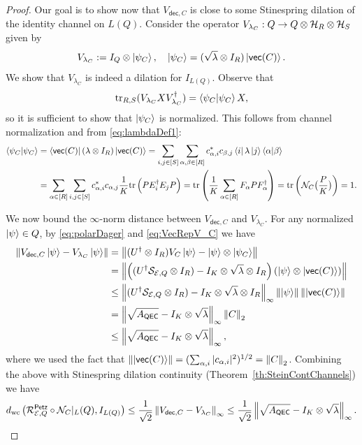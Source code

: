 \documentclass[10pt]{article}
\newcommand{\tr}{\mathrm{tr}}
\newcommand{\p}[1]{\left(#1\right)}
\newcommand{\norm}[1]{\left\|#1\right\|}
\newcommand{\s}[1]{\mathsf{#1}}
\begin{document}
\begin{proof}
     Our goal is to show now that $V_{\s{dec},C}$ is close to some Stinespring dilation of the identity channel on $L(Q)$. Consider the operator $V_{\lambda_C}:Q\to Q\otimes {\cal H}_R\otimes {\cal H}_S$ given by 
     \[V_{\lambda_C}:=I_Q\otimes \ket{\psi_C}, \quad \ket{\psi_C}=(\sqrt{\lambda}\otimes I_R)\ket{\s{vec}(C)}. \]
     We show that $V_{\lambda_C}$ is indeed a dilation for $I_{L(Q)}$. Observe that
     \[\tr_{R,S}(V_{\lambda_C} XV_{\lambda_C}^\dag)=\braket{\psi_C|\psi_C}X, \]
    so it is sufficient to show that  $\ket{\psi_C}$ is normalized. This follows from channel normalization and from \eqref{eq:lambdaDef1}:
    \begin{align*}
        \braket{\psi_C|\psi_C}&=\bra{{\s{vec}(C)}}({\lambda}\otimes I_R)\ket{\s{vec}(C)}=\sum_{i,j\in [S]}\sum_{\alpha,\beta\in [R]}c_{\alpha,i}^* c_{\beta,j}\bra{i}\lambda \ket{j}\braket{\alpha |\beta}\\
        &=\sum_{\alpha\in[R]}\sum_{i,j\in [S]}c_{\alpha,i} ^*c_{\alpha,j}\frac{1}{K}\tr\p{P E_i^\dag E_j P}=\tr\p{\frac{1}{K}\sum_{\alpha \in[R]} F_\alpha PF_{\alpha}^\dag }=\tr\p{\calN_C\big(\frac{P}{K}\big)}=1.
    \end{align*}

    We now bound the $\infty$-norm distance between $V_{\s{dec},C}$ and $V_{\lambda_C}$. For any normalized $\ket{\psi}\in Q$, by \eqref{eq:polarDager} and \eqref{eq:VecRepV_C} we have
    \begin{align*}
        \norm{V_{\s{dec},C}\ket{\psi}-V_{\lambda_C}\ket{\psi}}&=\norm{(U^\dag \otimes I_R)V_C\ket{\psi}-\ket{\psi}\otimes \ket{\psi_C}} \\
        &=\norm{\p{(U^\dag \calS_{\calE,Q} \otimes I_R)-I_K\otimes\sqrt{\lambda}\otimes I_R}(\ket{\psi}\otimes \ket{\s{vec}(C)} )}\\
        &\leq \norm{(U^\dag \calS_{\calE,Q} \otimes I_R)-I_K\otimes\sqrt{\lambda}\otimes I_R}_\infty \norm{\ket{\psi}}\norm{\ket{\s{vec}(C)}}\\
        &=\norm{\sqrt{A_{\s{QEC}}}-I_K \otimes \sqrt{\lambda}}_\infty\norm{C}_2
        \\&\leq \norm{\sqrt{A_{\s{QEC}}}-I_K \otimes \sqrt{\lambda}}_\infty,
    \end{align*}
    where we used the fact that $\norm{\ket{\s{vec}(C)}}=(\sum_{\alpha,i}|c_{\alpha,i}|^2)^{1/2}=\norm{C}_2$. Combining the above with Stinespring dilation continuity (Theorem~\ref{th:SteinContChannels}) we have 
    \[d_{\mathrm{wc}}\p{\calR_{\calE,Q}^{\s{Petz}}\circ \calN_C|_L(Q),I_{L(Q)}}\leq \frac{1}{\sqrt{2}}\norm{V_{\s{dec},C}-V_{\lambda_C}}_{\infty}\leq \frac{1}{\sqrt{2}}\norm{\sqrt{A_{\s{QEC}}}-I_K \otimes \sqrt{\lambda}}_\infty.\]
\end{proof}
\end{document}
